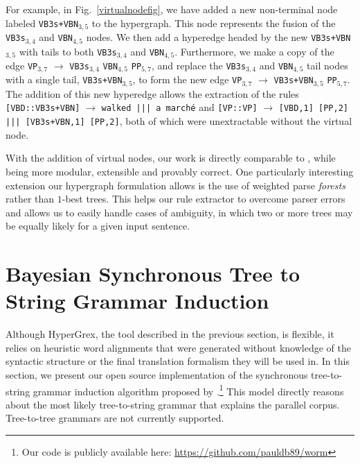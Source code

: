 \documentclass[nofonts]{pbml} %
\begin{document}
For example, in Fig.~\ref{virtualnodefig},
we have added a new non-terminal node labeled \texttt{VB3s+VBN}$_{3,5}$ to the hypergraph. This node represents the fusion of the \texttt{VB3s}$_{3,4}$ and \texttt{VBN}$_{4,5}$ nodes.
We then add a hyperedge headed by the new \texttt{VB3s+VBN}$_{3,5}$ with tails to both \texttt{VB3s}$_{3,4}$ and \texttt{VBN}$_{4,5}$.
Furthermore, we make a copy of the edge \texttt{VP}$_{3,7}$ $\rightarrow$ \texttt{VB3s}$_{3,4}$ \texttt{VBN}$_{4,5}$ \texttt{PP}$_{5,7}$, and replace the
\texttt{VB3s}$_{3,4}$ and \texttt{VBN}$_{4,5}$ tail nodes with a single tail, \texttt{VB3s+VBN}$_{3,5}$, to form the new edge
\texttt{VP}$_{3,7}$ $\rightarrow$ \texttt{VB3s+VBN}$_{3,5}$ \texttt{PP}$_{5,7}$. The addition of this new hyperedge allows the extraction of the rules
\texttt{[VBD::VB3s+VBN]} $\rightarrow$ \texttt{walked ||| a march\'{e}} and
\texttt{[VP::VP]} $\rightarrow$ \texttt{[VBD,1] [PP,2]  ||| [VB3s+VBN,1] [PP,2]}, both of which were unextractable without the virtual node.

With the addition of virtual nodes, our work is directly comparable to \citet{hanneman2011general}, while being more modular, extensible and provably correct.
One particularly interesting extension our hypergraph formulation allows is the use of weighted parse \emph{forests} rather than $1$-best trees.
This helps our rule extractor to overcome parser errors and allows us to easily handle cases of ambiguity, in which two or more trees may be equally likely
for a given input sentence.


\section{Bayesian Synchronous Tree to String Grammar Induction}
\label{sec:bayes}

 Although HyperGrex, the tool described in the previous section, is flexible, it relies on heuristic word alignments that were generated without knowledge of the syntactic structure or the final translation formalism they will be used in. In this section, we present our open source implementation of the synchronous tree-to-string grammar induction algorithm proposed by \citet{Cohn2009}.\footnote{Our code is publicly available here: \url{https://github.com/pauldb89/worm}} This model directly reasons about the most likely tree-to-string grammar that explains the parallel corpus. Tree-to-tree grammars are not currently supported.
\end{document}
